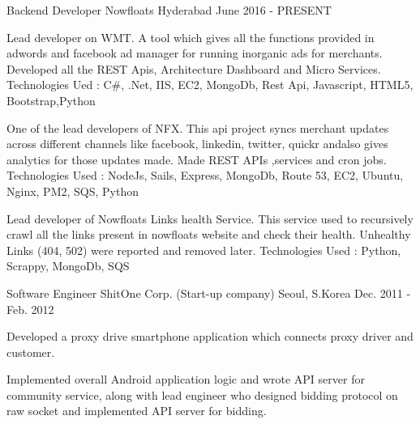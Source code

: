 

\begin{cventries}

  \cventry
    {Backend Developer} %
    {Nowfloats} %
    {Hyderabad} %
    {June 2016 - PRESENT} %
    {
      \begin{cvitems} %
        \item {Lead developer on WMT. A tool which gives all the functions provided in adwords and facebook ad manager for running inorganic ads for merchants. Developed all the REST Apis, Architecture Dashboard and Micro Services. Technologies Ued : C\#, .Net, IIS, EC2, MongoDb, Rest Api, Javascript, HTML5, Bootstrap,Python}
        \item {One of the lead developers of NFX. This api project syncs merchant updates across different channels like facebook, linkedin, twitter, quickr andalso gives analytics for those updates made. Made REST APIs ,services and cron jobs. Technologies Used : NodeJs, Sails, Express, MongoDb, Route 53, EC2, Ubuntu, Nginx, PM2, SQS, Python}
        \item {Lead developer of Nowfloats Links health Service. This service used to recursively crawl all the links present in nowfloats website and check their health. Unhealthy Links (404, 502) were reported and removed later. Technologies Used : Python, Scrappy, MongoDb, SQS  }
      \end{cvitems}
    }

  \cventry
    {Software Engineer} %
    {ShitOne Corp. (Start-up company)} %
    {Seoul, S.Korea} %
    {Dec. 2011 - Feb. 2012} %
    {
      \begin{cvitems} %
        \item {Developed a proxy drive smartphone application which connects proxy driver and customer.}
        \item {Implemented overall Android application logic and wrote API server for community service, along with lead engineer who designed bidding protocol on raw socket and implemented API server for bidding.}
      \end{cvitems}
    }


\end{cventries}
